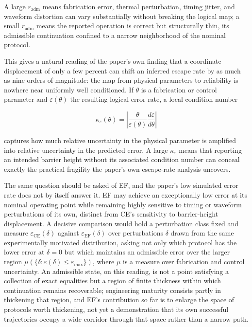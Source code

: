 \documentclass[11pt]{article}
\begin{document}
A large $r_{\mathrm{adm}}$ means fabrication error, thermal perturbation, timing jitter, and waveform distortion can vary substantially without breaking the logical map; a small $r_{\mathrm{adm}}$ means the reported operation is correct but structurally thin, its admissible continuation confined to a narrow neighborhood of the nominal protocol.

This gives a natural reading of the paper's own finding that a coordinate displacement of only a few percent can shift an inferred escape rate by as much as nine orders of magnitude: the map from physical parameters to reliability is nowhere near uniformly well conditioned. If $\theta$ is a fabrication or control parameter and $\varepsilon(\theta)$ the resulting logical error rate, a local condition number

\[
\kappa_\varepsilon(\theta) = \left|\frac{\theta}{\varepsilon(\theta)}\frac{d\varepsilon}{d\theta}\right|
\]

captures how much relative uncertainty in the physical parameter is amplified into relative uncertainty in the predicted error. A large $\kappa_\varepsilon$ means that reporting an intended barrier height without its associated condition number can conceal exactly the practical fragility the paper's own escape-rate analysis uncovers.

The same question should be asked of EF, and the paper's low simulated error rate does not by itself answer it. EF may achieve an exceptionally low error at its nominal operating point while remaining highly sensitive to timing or waveform perturbations of its own, distinct from CE's sensitivity to barrier-height displacement. A decisive comparison would hold a perturbation class fixed and measure $\varepsilon_{\mathrm{CE}}(\delta)$ against $\varepsilon_{\mathrm{EF}}(\delta)$ over perturbations $\delta$ drawn from the same experimentally motivated distribution, asking not only which protocol has the lower error at $\delta=0$ but which maintains an admissible error over the larger region $\mu(\{\delta : \varepsilon(\delta)\le\varepsilon_{\max}\})$, where $\mu$ is a measure over fabrication and control uncertainty. An admissible state, on this reading, is not a point satisfying a collection of exact equalities but a region of finite thickness within which continuation remains recoverable; engineering maturity consists partly in thickening that region, and EF's contribution so far is to enlarge the space of protocols worth thickening, not yet a demonstration that its own successful trajectories occupy a wide corridor through that space rather than a narrow path.
\end{document}
